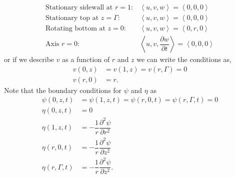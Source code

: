 \documentclass[11pt,letterpaper]{article}
\newcommand{\fdel}[2]{\dfrac{\partial{#1}}{\partial {#2}}} %
\newcommand{\sdel}[2]{\dfrac{\partial^2{#1}}{\partial{#2}^2}} %
\newcommand{\fang}[1]{\left\langle{#1}\right\rangle}
\begin{document}
\begin{align*}
    \text{Stationary sidewall at } r=1:  &\fang{u,v,w} = \fang{0,0,0}\nonumber\\
    \text{Stationary top at } z=\Gamma:  &\fang{u,v,w} = \fang{0,0,0}\nonumber\\
    \text{Rotating bottom at } z = 0:  &\fang{u,v,w} = \fang{0,r,0}\\
    \text{Axis } r=0:  &\fang{u,v,\fdel{w}{t}} = \fang{0,0,0}\nonumber
\end{align*}
or if we describe $v$ as a function of $r$ and $z$ we can write the conditions as,
\begin{align}
    v(0,z) &= v(1,z) = v(r,\Gamma) = 0\\
    v(r,0) &= r. 
\end{align}
Note that the boundary conditions for $\psi$ and $\eta$ as
\begin{align*}
    \psi(0,z,t) &= \psi(1,z,t) = \psi(r,0,t) = \psi(r,\Gamma, t) = 0 \\
    \eta(0,z,t) &= 0 \\
    \eta(1,z,t) &= -\dfrac{1}{r}\sdel{\psi}{r} \\
    \eta(r,0,t) &= -\dfrac{1}{r}\sdel{\psi}{z} \\
    \eta(r,\Gamma,t) &= -\dfrac{1}{r}\sdel{\psi}{z}.
\end{align*}
\end{document}
